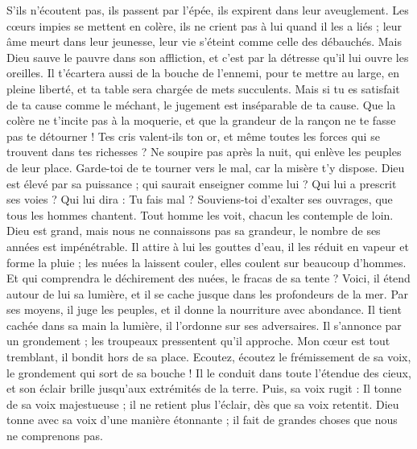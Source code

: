 \begin{multicols}{2}
S'ils n'écoutent pas, ils passent par l'épée, ils expirent dans leur aveuglement.
Les cœurs impies se mettent en colère, ils ne crient pas à lui quand il les a liés ;
leur âme meurt dans leur jeunesse, leur vie s'éteint comme celle des débauchés.
Mais Dieu sauve le pauvre dans son affliction, et c'est par la détresse qu'il lui ouvre les oreilles.
Il t'écartera aussi de la bouche de l'ennemi, pour te mettre au large, en pleine liberté, et ta table sera chargée de mets succulents.
Mais si tu es satisfait de ta cause comme le méchant, le jugement est inséparable de ta cause.
Que la colère ne t'incite pas à la moquerie, et que la grandeur de la rançon ne te fasse pas te détourner !
Tes cris valent-ils ton or, et même toutes les forces qui se trouvent dans tes richesses ?
Ne soupire pas après la nuit, qui enlève les peuples de leur place.
Garde-toi de te tourner vers le mal, car la misère t'y dispose.
Dieu est élevé par sa puissance ; qui saurait enseigner comme lui ?
Qui lui a prescrit ses voies ? Qui lui dira : Tu fais mal ?
Souviens-toi d'exalter ses ouvrages, que tous les hommes chantent.
Tout homme les voit, chacun les contemple de loin.
Dieu est grand, mais nous ne connaissons pas sa grandeur, le nombre de ses années est impénétrable.
Il attire à lui les gouttes d'eau, il les réduit en vapeur et forme la pluie ;
les nuées la laissent couler, elles coulent sur beaucoup d'hommes.
Et qui comprendra le déchirement des nuées, le fracas de sa tente ?
Voici, il étend autour de lui sa lumière, et il se cache jusque dans les profondeurs de la mer.
Par ses moyens, il juge les peuples, et il donne la nourriture avec abondance.
Il tient cachée dans sa main la lumière, il l'ordonne sur ses adversaires.
Il s'annonce par un grondement ; les troupeaux pressentent qu'il approche.
\VerseOne{}Mon cœur est tout tremblant, il bondit hors de sa place.
Ecoutez, écoutez le frémissement de sa voix, le grondement qui sort de sa bouche !
Il le conduit dans toute l'étendue des cieux, et son éclair brille jusqu'aux extrémités de la terre.
Puis, sa voix rugit : Il tonne de sa voix majestueuse ; il ne retient plus l'éclair, dès que sa voix retentit.
Dieu tonne avec sa voix d'une manière étonnante ; il fait de grandes choses que nous ne comprenons pas.

\end{multicols}
